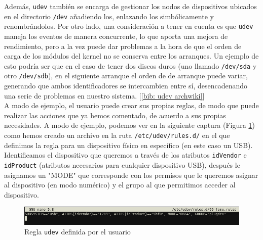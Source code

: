 \documentclass[a4paper, oneside, 12pt]{book}
\begin{document}
	\noindent Además, \texttt{udev} también se encarga de gestionar los nodos de dispositivos ubicados en el directorio \texttt{/dev} añadiendo los, enlazando los simbólicamente y renombrándolos. Por otro lado, una consideración a tener en cuenta es que \texttt{udev} maneja los eventos de manera concurrente, lo que aporta una mejora de rendimiento, pero a la vez puede dar problemas a la hora de que el orden de carga de los módulos del kernel no se conserva entre los arranques. Un ejemplo de esto podría ser que en el caso de tener dos discos duros (uno llamado \texttt{/dev/sda} y otro \texttt{/dev/sdb}), en el siguiente arranque el orden de de arranque puede variar, generando que ambos identificadores se intercambien entre sí, desencadenando una serie de problemas en nuestro sistema. [\ref{bib: udev archwiki}]\\
	
	
	\noindent A modo de ejemplo, el usuario puede crear sus propias reglas, de modo que puede realizar las acciones que ya hemos comentado, de acuerdo a sus propias necesidades. A modo de ejemplo, podemos ver en la siguiente captura (Figura \ref{img: udev rule}) como hemos creado un archivo en la ruta \texttt{/etc/udev/rules.d/} en el que definimos la regla para un dispositivo físico en específico (en este caso un USB). Identificamos el dispositivo que queremos a través de los atributos \texttt{idVendor} e \texttt{idProduct} (atributos necesarios para cualquier dispositivo USB), después le asignamos un "MODE" que corresponde con los permisos que le queremos asignar al dispositivo (en modo numérico) y el grupo al que permitimos acceder al dispositivo.\\
	
	\begin{figure}[h!]
		\begin{center}
			\includegraphics[width=1\textwidth]{img/udev_rule.png}
			\caption{Regla \texttt{udev} definida por el usuario} 
			\label{img: udev rule}
		\end{center}
	\end{figure}
	
\end{document}
